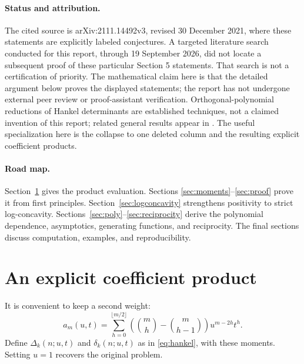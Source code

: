\documentclass[11pt,letterpaper]{article}
\numberwithin{equation}{section}
\theoremstyle{definition}
\begin{document}
\paragraph{Status and attribution.}
The cited source is arXiv:2111.14492v3, revised 30 December 2021, where
these statements are explicitly labeled conjectures. A targeted literature
search conducted for this report, through 19 September 2026, did not locate
a subsequent proof of these particular Section 5 statements. That search
is not a certification of priority. The mathematical claim here is that
the detailed argument below proves the displayed statements; the report
has not undergone external peer review or proof-assistant verification.
Orthogonal-polynomial reductions of Hankel determinants are established
techniques, not a claimed invention of this report; related general
results appear in \cite{CK2020,K2021}. The useful specialization here is
the collapse to one deleted column and the resulting explicit coefficient
products.

\paragraph{Road map.}
Section~\ref{sec:product} gives the product evaluation. Sections
\ref{sec:moments}--\ref{sec:proof} prove it from first principles.
Section~\ref{sec:logconcavity} strengthens positivity to strict
log-concavity. Sections~\ref{sec:poly}--\ref{sec:reciprocity} derive the
polynomial dependence, asymptotics, generating functions, and reciprocity.
The final sections discuss computation, examples, and reproducibility.

\section{An explicit coefficient product}\label{sec:product}
It is convenient to keep a second weight:
\begin{equation}\label{eq:two-weights}
 a_m(u,t)=\sum_{h=0}^{\lfloor m/2\rfloor}
 \left(\binom mh-\binom m{h-1}\right)u^{m-2h}t^h.
\end{equation}
Define \(\Delta_k(n;u,t)\) and \(\delta_k(n;u,t)\) as in
\eqref{eq:hankel}, with these moments. Setting \(u=1\) recovers the
original problem.
\end{document}
